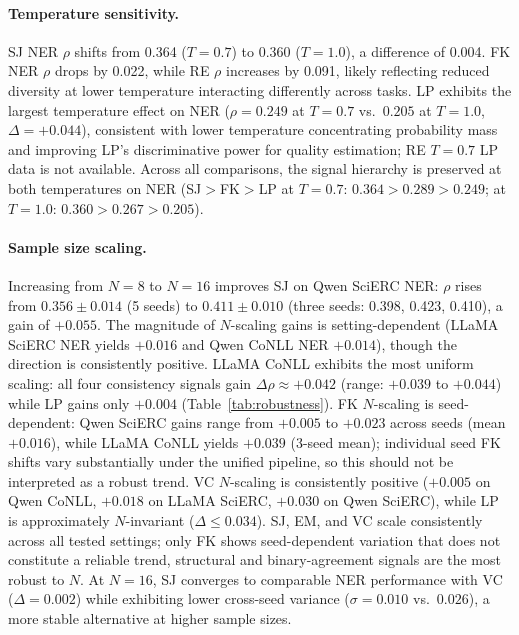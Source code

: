 \paragraph{Temperature sensitivity.}
SJ NER $\rho$ shifts from 0.364 ($T{=}0.7$) to 0.360 ($T{=}1.0$), a difference of 0.004.
FK NER $\rho$ drops by 0.022, while RE $\rho$ increases by 0.091, likely reflecting reduced diversity at lower temperature interacting differently across tasks.
LP exhibits the largest temperature effect on NER ($\rho{=}0.249$ at $T{=}0.7$ vs.\ $0.205$ at $T{=}1.0$, $\Delta{=}{+}0.044$), consistent with lower temperature concentrating probability mass and improving LP's discriminative power for quality estimation; RE $T{=}0.7$ LP data is not available.
Across all comparisons, the signal hierarchy is preserved at both temperatures on NER (SJ${>}$FK${>}$LP at $T{=}0.7$: $0.364{>}0.289{>}0.249$; at $T{=}1.0$: $0.360{>}0.267{>}0.205$).

\paragraph{Sample size scaling.}
Increasing from $N{=}8$ to $N{=}16$ improves SJ on Qwen SciERC NER: $\rho$ rises from $0.356{\pm}0.014$ (5 seeds) to $0.411{\pm}0.010$ (three seeds: 0.398, 0.423, 0.410), a gain of $+0.055$.
The magnitude of $N$-scaling gains is setting-dependent (LLaMA SciERC NER yields $+0.016$ and Qwen CoNLL NER $+0.014$), though the direction is consistently positive.
LLaMA CoNLL exhibits the most uniform scaling: all four consistency signals gain $\Delta\rho{\approx}{+}0.042$ (range: $+0.039$ to $+0.044$) while LP gains only $+0.004$ (Table~\ref{tab:robustness}).
FK $N$-scaling is seed-dependent: Qwen SciERC gains range from $+0.005$ to $+0.023$ across seeds (mean $+0.016$), while LLaMA CoNLL yields $+0.039$ (3-seed mean); individual seed FK shifts vary substantially under the unified pipeline, so this should not be interpreted as a robust trend.
VC $N$-scaling is consistently positive ($+0.005$ on Qwen CoNLL, $+0.018$ on LLaMA SciERC, $+0.030$ on Qwen SciERC), while LP is approximately $N$-invariant ($\Delta{\leq}0.034$).
SJ, EM, and VC scale consistently across all tested settings; only FK shows seed-dependent variation that does not constitute a reliable trend, structural and binary-agreement signals are the most robust to $N$.
At $N{=}16$, SJ converges to comparable NER performance with VC ($\Delta{=}0.002$) while exhibiting lower cross-seed variance ($\sigma{=}0.010$ vs.\ $0.026$), a more stable alternative at higher sample sizes.

